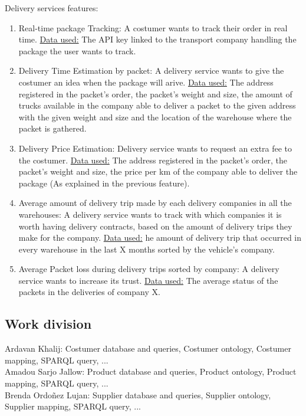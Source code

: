 \documentclass{article}
\begin{document}
\noindent Delivery services features:
\begin{enumerate}
  \item Real-time package Tracking: A costumer wants to track their order in real time. \underline{Data used:} The API key linked to the transport company handling the package the user wants to track.
  \item Delivery Time Estimation by packet: A delivery service wants to give the costumer an idea when the package will arive. \underline{Data used:} The address registered in the packet’s order, the packet’s weight and size, the amount of trucks available in the company able to deliver a packet to the given address with the given weight and size and the location of the warehouse where the packet is gathered.
  \item Delivery Price Estimation: Delivery service wants to request an extra fee to the costumer. \underline{Data used:} The address registered in the packet’s order, the packet’s weight and size, the price per km of the company able to deliver the package (As explained in the previous feature).
  \item Average amount of delivery trip made by each delivery companies in all the warehouses: A delivery service wants to track with which companies it is worth having delivery contracts, based on the amount of delivery trips they make for the company. \underline{Data used:} he amount of delivery trip that occurred in every warehouse in the last X months sorted by the vehicle’s company.
  \item Average Packet loss during delivery trips sorted by company: A delivery service wants to increase its trust. \underline{Data used:} The average status of the packets in the deliveries of company X.
\end{enumerate}


\subsection{Work division}
Ardavan Khalij: Costumer database and queries, Costumer ontology, Costumer mapping, SPARQL query, ...
\\

\noindent Amadou Sarjo Jallow: Product database and queries, Product ontology, Product mapping, SPARQL query, ...
\\

\noindent Brenda Ordoñez Lujan: Supplier database and queries, Supplier ontology, Supplier mapping, SPARQL query, ...
\\
\end{document}
